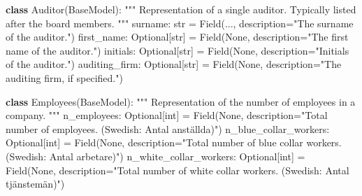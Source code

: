 \documentclass[
]{article}
\newenvironment{Shaded}{\begin{snugshade}}{\end{snugshade}}
\newcommand{\BuiltInTok}[1]{\textcolor[rgb]{0.00,0.23,0.31}{#1}}
\newcommand{\CommentTok}[1]{\textcolor[rgb]{0.37,0.37,0.37}{#1}}
\newcommand{\KeywordTok}[1]{\textcolor[rgb]{0.00,0.23,0.31}{\textbf{#1}}}
\newcommand{\NormalTok}[1]{\textcolor[rgb]{0.00,0.23,0.31}{#1}}
\newcommand{\OperatorTok}[1]{\textcolor[rgb]{0.37,0.37,0.37}{#1}}
\newcommand{\StringTok}[1]{\textcolor[rgb]{0.13,0.47,0.30}{#1}}
\newcommand{\VariableTok}[1]{\textcolor[rgb]{0.07,0.07,0.07}{#1}}
\begin{document}
\begin{Shaded}
\begin{Highlighting}[]
\KeywordTok{class}\NormalTok{ Auditor(BaseModel):}
    \CommentTok{"""}
\CommentTok{    Representation of a single auditor.}
\CommentTok{    Typically listed after the board members.}
\CommentTok{    """}
\NormalTok{    surname: }\BuiltInTok{str} \OperatorTok{=}\NormalTok{ Field(..., description}\OperatorTok{=}\StringTok{"The surname of the auditor."}\NormalTok{)}
\NormalTok{    first\_name: Optional[}\BuiltInTok{str}\NormalTok{] }\OperatorTok{=}\NormalTok{ Field(}\VariableTok{None}\NormalTok{, description}\OperatorTok{=}\StringTok{"The first name of the auditor."}\NormalTok{)}
\NormalTok{    initials: Optional[}\BuiltInTok{str}\NormalTok{] }\OperatorTok{=}\NormalTok{ Field(}\VariableTok{None}\NormalTok{, description}\OperatorTok{=}\StringTok{"Initials of the auditor."}\NormalTok{)}
\NormalTok{    auditing\_firm: Optional[}\BuiltInTok{str}\NormalTok{] }\OperatorTok{=}\NormalTok{ Field(}\VariableTok{None}\NormalTok{, description}\OperatorTok{=}\StringTok{"The auditing firm, if specified."}\NormalTok{)}


\KeywordTok{class}\NormalTok{ Employees(BaseModel):}
    \CommentTok{"""}
\CommentTok{    Representation of the number of employees in a company.}
\CommentTok{    """}
\NormalTok{    n\_employees: Optional[}\BuiltInTok{int}\NormalTok{] }\OperatorTok{=}\NormalTok{ Field(}\VariableTok{None}\NormalTok{, description}\OperatorTok{=}\StringTok{"Total number of employees. (Swedish: Antal anställda)"}\NormalTok{)}
\NormalTok{    n\_blue\_collar\_workers: Optional[}\BuiltInTok{int}\NormalTok{] }\OperatorTok{=}\NormalTok{ Field(}\VariableTok{None}\NormalTok{, description}\OperatorTok{=}\StringTok{"Total number of blue collar workers. (Swedish: Antal arbetare)"}\NormalTok{)}
\NormalTok{    n\_white\_collar\_workers: Optional[}\BuiltInTok{int}\NormalTok{] }\OperatorTok{=}\NormalTok{ Field(}\VariableTok{None}\NormalTok{, description}\OperatorTok{=}\StringTok{"Total number of white collar workers. (Swedish: Antal tjänstemän)"}\NormalTok{)}



\end{Highlighting}
\end{Shaded}
\end{document}

